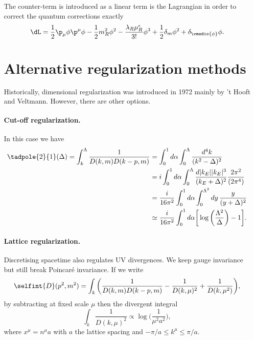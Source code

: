 The counter-term is introduced as a linear term is the Lagrangian in order to correct the quantum corrections exactly
\begin{equation}
    \dL = \frac{1}{2}\p_\mu\phi\p^\mu\phi - \frac{1}{2}m_R^2\phi^2 - \frac{\lambda_R\mu_R^\epsilon}{3!}\phi^3 + \frac{1}{2}\delta_{m}\phi^2 + \delta_{\vmedio{\phi}}\phi.
\end{equation}

\section{Alternative regularization methods}
Historically, dimensional regularization was introduced in 1972 mainly by 't Hooft and Veltmann. However, there are other options.

\paragraph{Cut-off regularization.} In this case we have
\begin{equation}
    \begin{split}
        \tadpole{2}{1}(\Delta) = \int_k^\Lambda \frac{1}{D(k,m)D(k - p,m)} &= \int_0^1 d\alpha\int_0^\Lambda \frac{d^4k}{(k^2 - \Delta)^2} \\
        &= i\int_0^1 d\alpha\int_0^\Lambda\frac{d|k_E||k_E|^3}{(k_E + \Delta)^2}\frac{2\pi^2}{(2\pi^4)} \\
        &= \frac{i}{16\pi^2}\int_0^1d\alpha\int_0^{\Lambda^2} dy\,\frac{y}{(y + \Delta)^2} \\
        &\simeq \frac{i}{16\pi^2}\int_0^1d\alpha\bigg[\log{\bigg(\frac{\Lambda^2}{\Delta}\bigg)} - 1\bigg].
    \end{split}
\end{equation}

\paragraph{Lattice regularization.} Discretising spacetime also regulates UV divergences. We keep gauge invariance but still break Poincaré invariance. If we write
\begin{equation}
    \selfint{D}(p^2,m^2) = \int_k\bigg(\frac{1}{D(k,m)D(k - p,m)} - \frac{1}{D(k,\mu)^2} + \frac{1}{D(k,\mu^2)}\bigg),
\end{equation}
by subtracting at fixed scale $\mu$ then the divergent integral 
\begin{equation}
    \int_k\frac{1}{D(k,\mu)^2} \propto \log{\bigg(\frac{1}{\mu^2a^2}\bigg)},
\end{equation}
where $x^\mu = n^\mu a$ with $a$ the lattice spacing and $-\pi/a \le k^\mu \le \pi/a$. 

